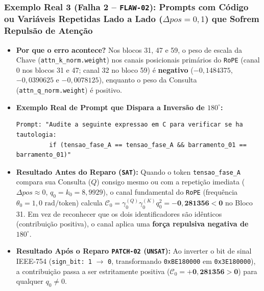 \documentclass[11pt,a4paper]{article}
\theoremstyle{definition}
\begin{document}
\subsubsection{Exemplo Real 3 (Falha 2 -- \texttt{FLAW-02}): Prompts com Código ou Variáveis Repetidas Lado a Lado ($\Delta pos = 0, 1$) que Sofrem Repulsão de Atenção}
\begin{itemize}
    \item \textbf{Por que o erro acontece?} Nos blocos 31, 47 e 59, o peso de escala da Chave (\texttt{attn\_k\_norm.weight}) nos canais posicionais primários do \texttt{RoPE} (canal $0$ nos blocos 31 e 47; canal $32$ no bloco 59) é \textbf{negativo} ($-0{,}1484375$, $-0{,}0390625$ e $-0{,}0078125$), enquanto o peso da Consulta (\texttt{attn\_q\_norm.weight}) é positivo.
    \item \textbf{Exemplo Real de Prompt que Dispara a Inversão de $180^\circ$:}
    \begin{verbatim}
Prompt: "Audite a seguinte expressao em C para verificar se ha tautologia:
         if (tensao_fase_A == tensao_fase_A && barramento_01 == barramento_01)"
    \end{verbatim}
    \item \textbf{Resultado Antes do Reparo (\texttt{SAT}):} Quando o token \texttt{tensao\_fase\_A} compara sua Consulta ($Q$) consigo mesmo ou com a repetição imediata ($\Delta pos \approx 0$, $q_0 = k_0 = 8{,}9929$), o canal fundamental do \texttt{RoPE} (frequência $\theta_0 = 1{,}0\text{ rad/token}$) calcula $\mathcal{C}_0 = \gamma_0^{(Q)}\gamma_0^{(K)} q_0^2 = \mathbf{-0{,}281356 < 0}$ no Bloco 31. Em vez de reconhecer que os dois identificadores são idênticos (contribuição positiva), o canal aplica uma \textbf{força repulsiva negativa de $180^\circ$}.
    \item \textbf{Resultado Após o Reparo \texttt{PATCH-02} (\texttt{UNSAT}):} Ao inverter o bit de sinal IEEE-754 (\texttt{sign\_bit: 1} $\to$ \texttt{0}, transformando \texttt{0xBE180000} em \texttt{0x3E180000}), a contribuição passa a ser estritamente positiva ($\mathcal{C}_0 = \mathbf{+0{,}281356 > 0}$) para qualquer $q_0 \neq 0$.
\end{itemize}
\end{document}
